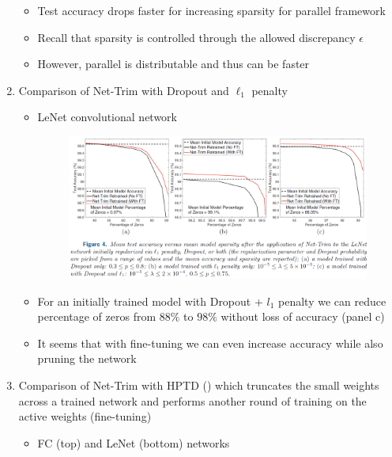\begin{enumerate}
\begin{itemize}
		\item Test accuracy drops faster for increasing sparsity for parallel framework
		\item Recall that sparsity is controlled through the allowed discrepancy $\epsilon$
		\item However, parallel is distributable and thus can be faster
	\end{itemize}
\newpage
	\item Comparison of Net-Trim with Dropout and $\ell_1$ penalty
	\begin{itemize}
		\item LeNet convolutional network
			\begin{figure}[H]
			\centering
			\includegraphics[width=1\linewidth]{./figs/dropout_comp.png}  
			\caption*{}
		\end{figure}
		\item For an initially trained model with Dropout + $l_1$ penalty we can reduce percentage of zeros from $88 \%$ to $98 \%$ without loss of accuracy (panel c)
		\item It seems that with fine-tuning we can even increase accuracy while also pruning the network
	\end{itemize}
\newpage
\item Comparison of Net-Trim with HPTD (\cite{han2015learning}) which truncates the small weights across a trained network and performs another round of training on the active weights (fine-tuning)
\begin{itemize}
	\item FC (top) and LeNet (bottom) networks
	\begin{figure}[H]
		\centering

\end{figure}
\end{itemize}
\end{enumerate}
